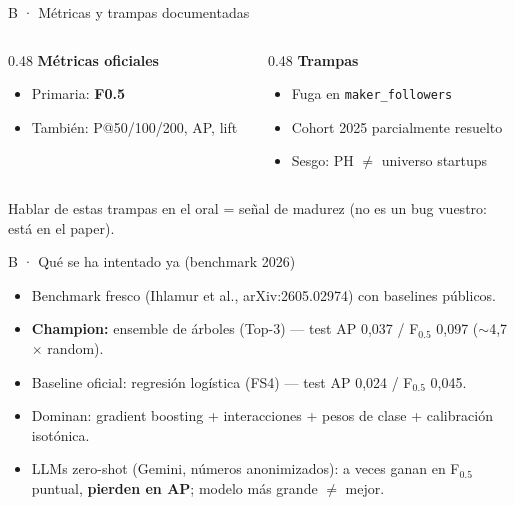 \documentclass[aspectratio=169,10pt]{beamer}
\begin{document}
\begin{frame}{B · Métricas y trampas documentadas}
  \begin{columns}[T]
    \begin{column}{0.48\textwidth}
      \textbf{Métricas oficiales}
      \begin{itemize}
        \item Primaria: \textbf{F0.5}
        \item También: P@50/100/200, AP, lift
      \end{itemize}
    \end{column}
    \begin{column}{0.48\textwidth}
      \textbf{Trampas}
      \begin{itemize}
        \item Fuga en \texttt{maker\_followers}
        \item Cohort 2025 parcialmente resuelto
        \item Sesgo: PH $\neq$ universo startups
      \end{itemize}
    \end{column}
  \end{columns}
  \vspace{0.4em}
  Hablar de estas trampas en el oral = señal de madurez (no es un bug vuestro: está en el paper).
\end{frame}

\begin{frame}{B · Qué se ha intentado ya (benchmark 2026)}
  \begin{itemize}
    \item Benchmark fresco (Ihlamur et al., arXiv:2605.02974) con baselines públicos.
    \item \textbf{Champion:} ensemble de árboles (Top-3) --- test AP 0{,}037 / F$_{0.5}$ 0{,}097 ($\sim$4{,}7$\times$ random).
    \item Baseline oficial: regresión logística (FS4) --- test AP 0{,}024 / F$_{0.5}$ 0{,}045.
    \item Dominan: gradient boosting + interacciones + pesos de clase + calibración isotónica.
    \item LLMs zero-shot (Gemini, números anonimizados): a veces ganan en F$_{0.5}$ puntual, \textbf{pierden en AP}; modelo más grande $\neq$ mejor.
  \end{itemize}
\end{frame}
\end{document}
